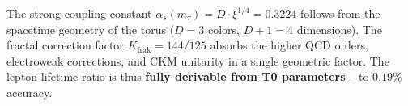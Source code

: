 	The strong coupling constant $\alpha_s(m_\tau) = D \cdot \xi^{1/4} = 0.3224$ follows from the spacetime geometry of the torus ($D = 3$ colors, $D+1 = 4$ dimensions). The fractal correction factor $K_\text{frak} = 144/125$ absorbs the higher QCD orders, electroweak corrections, and CKM unitarity in a single geometric factor. The lepton lifetime ratio is thus \textbf{fully derivable from T0 parameters} -- to $0.19\%$ accuracy.

